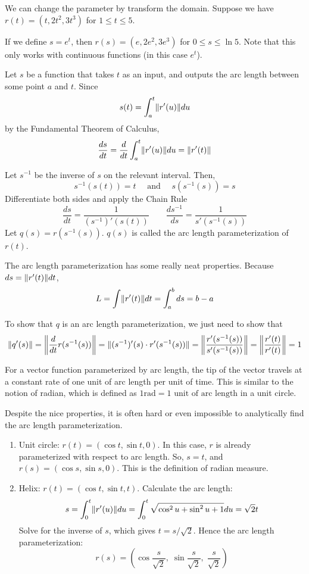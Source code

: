 We can change the parameter by transform the domain. Suppose we have $r(t) = (t,2t^2,3t^3)$ for $1 \leq t \leq 5$.

If we define $s = e^t$, then $r(s) = (e,2e^2,3e^3)$ for $0 \leq s \leq \ln 5$. Note that this only works with continuous functions (in this case $e^t$).

Let $s$ be a function that takes $t$ as an input, and outputs the arc length between some point $a$ and $t$. Since 
$$
s(t) = \int_a^t \lVert r'(u) \rVert du
$$
by the Fundamental Theorem of Calculus,
$$
\frac{ds}{dt} = \frac{d}{dt}\int_a^t \lVert r'(u) \rVert du = \lVert r'(t) \rVert
$$

Let $s^{-1}$ be the inverse of $s$ on the relevant interval. Then,
$$
s^{-1}(s(t)) = t \quad \text{ and } \quad s(s^{-1}(s))=s
$$
Differentiate both sides and apply the Chain Rule
$$
\frac{ds}{dt} = \frac{1}{(s^{-1})'(s(t))} \qquad \frac{ds^{-1}}{ds}=\frac{1}{s'(s^{-1}(s))}
$$
Let $q(s)=r(s^{-1}(s))$. $q(s)$ is called the arc length parameterization of $r(t)$.

The arc length parameterization has some really neat properties. Because $ds = \lVert r'(t) \rVert dt$,
$$
L = \int \lVert r'(t) \rVert dt = \int_a^b ds = b-a
$$

To show that $q$ is an arc length parameterization, we just need to show that
$$
\lVert q'(s) \rVert = \left\lVert{\frac{d}{dt} r(s^{-1}(s))}\right\rVert = \lVert (s^{-1})'(s) \cdot r'(s^{-1}(s)) \rVert = \left\lVert \frac{r'(s^{-1}(s))}{s'(s^{-1}(s))} \right\rVert = \left\lVert \frac{r'(t)}{r'(t)} \right\rVert = 1
$$

For a vector function parameterized by arc length, the tip of the vector travels at a constant rate of one unit of arc length per unit of time. This is similar to the notion of radian, which is defined as $1 \mathrm{rad} = 1 \text{ unit of arc length}$ in a unit circle.

Despite the nice properties, it is often hard or even impossible to analytically find the arc length parameterization.

\begin{example}
\begin{enumerate}
    \item Unit circle: $r(t) = (\cos t, \sin t, 0)$. In this case, $r$ is already parameterized with respect to arc length. So, $s=t$, and $r(s) = (\cos s, \sin s, 0)$. This is the definition of radian measure.
    \item Helix: $r(t) = (\cos t, \sin t, t)$. Calculate the arc length:
    $$
    s = \int_0^t \lVert r'(u) \rVert du = \int_0^t \sqrt{\cos^2 u + \sin^2 u + 1} du = \sqrt{2}t
    $$
    Solve for the inverse of $s$, which gives $t= s/\sqrt2$. Hence the arc length parameterization:
    $$
    r(s) = \left( \cos\frac{s}{\sqrt2},\; \sin\frac{s}{\sqrt2},\; \frac{s}{\sqrt2} \right)
    $$
\end{enumerate}
\end{example}

